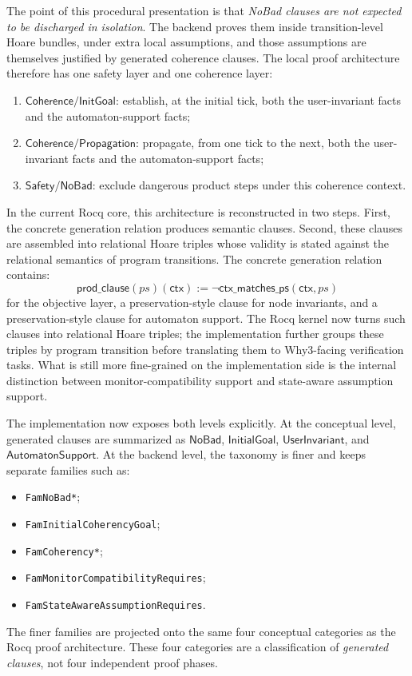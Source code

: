\documentclass[11pt,a4paper]{article}
\newcommand{\ctx}{\mathsf{ctx}}
\begin{document}
\noindent
The point of this procedural presentation is that \emph{NoBad clauses are not
expected to be discharged in isolation}. The backend proves them inside
transition-level Hoare bundles, under extra local assumptions, and those
assumptions are themselves justified by generated coherence clauses. The local
proof architecture therefore has one safety layer and one coherence layer:
\begin{enumerate}[leftmargin=1.4em]
\item \(\mathsf{Coherence/InitGoal}\): establish, at the initial tick, both the
  user-invariant facts and the automaton-support facts;
\item \(\mathsf{Coherence/Propagation}\): propagate, from one tick to the next,
  both the user-invariant facts and the automaton-support facts;
\item \(\mathsf{Safety/NoBad}\): exclude dangerous product steps under this
  coherence context.
\end{enumerate}

In the current Rocq core, this architecture is reconstructed in two steps.
First, the concrete generation relation produces semantic clauses. Second,
these clauses are assembled into relational Hoare triples whose validity is
stated against the relational semantics of program transitions. The concrete
generation relation contains:
\[
\mathsf{prod\_clause}(ps)(\ctx) := \neg \ctx\mathsf{\_matches\_ps}(\ctx,ps)
\]
for the objective layer, a preservation-style clause for node invariants, and a
preservation-style clause for automaton support. The Rocq kernel now turns such
clauses into relational Hoare triples; the implementation further groups these
triples by program transition before translating them to Why3-facing
verification tasks. What is still more fine-grained on the
implementation side is the internal distinction between monitor-compatibility
support and state-aware assumption support.

The implementation now exposes both levels explicitly. At the conceptual
level, generated clauses are summarized as \(\mathsf{NoBad}\),
\(\mathsf{InitialGoal}\), \(\mathsf{UserInvariant}\), and
\(\mathsf{AutomatonSupport}\). At the backend level, the taxonomy is finer and
keeps separate families such as:
\begin{itemize}[leftmargin=1.4em]
\item \texttt{FamNoBad*};
\item \texttt{FamInitialCoherencyGoal};
\item \texttt{FamCoherency*};
\item \texttt{FamMonitorCompatibilityRequires};
\item \texttt{FamStateAwareAssumptionRequires}.
\end{itemize}
The finer families are projected onto the same four conceptual categories as
the Rocq proof architecture. These four categories are a classification of
\emph{generated clauses}, not four independent proof phases.
\end{document}
